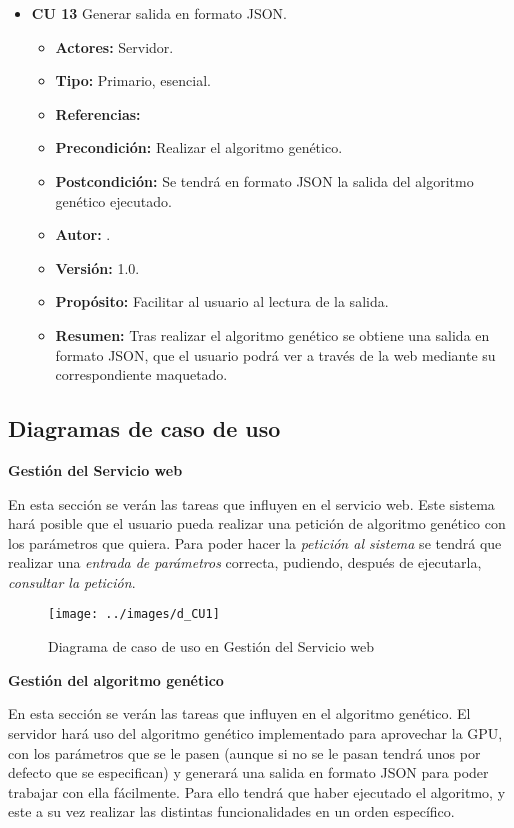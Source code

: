 \begin{itemize}
	\item \textbf{CU 13} Generar salida en formato JSON.
	\begin{itemize}
		\item \textbf{Actores:} Servidor.
		\item \textbf{Tipo:} Primario, esencial.
		\item \textbf{Referencias:} 
		\item \textbf{Precondición:} Realizar el algoritmo genético.
		\item \textbf{Postcondición:} Se tendrá en formato JSON la salida del algoritmo genético ejecutado.
		\item\textbf{ Autor:} {\autor}.
		\item \textbf{Versión:} 1.0.
		\item \textbf{Propósito:} Facilitar al usuario al lectura de la salida.
		\item \textbf{Resumen:} Tras realizar el algoritmo genético se obtiene una salida en formato JSON, que el usuario podrá ver a través de la web mediante su correspondiente maquetado.
	\end{itemize}				
	
	
\end{itemize} %

\newpage %
\subsection{Diagramas de caso de uso}

\bigskip
\textbf{Gestión del Servicio web}

\bigskip
En esta sección se verán las tareas que influyen en el servicio web. Este sistema hará posible que el usuario pueda realizar una petición de algoritmo genético con los parámetros que quiera. Para poder hacer la \textit{petición al sistema} se tendrá que realizar una \textit{entrada de parámetros} correcta, pudiendo, después de ejecutarla, \textit{consultar la petición}.


\bigskip
\begin{figure}[h]
	\centering
	\texttt{[image: ../images/d\_CU1]}
	\caption[Diagrama de caso de uso en Gestión del Servicio web]{Diagrama de caso de uso en Gestión del Servicio web}
	\label{fig:d_CU1}
\end{figure}



\newpage %
\textbf{Gestión del algoritmo genético}

\bigskip
En esta sección se verán las tareas que influyen en el algoritmo genético. El servidor hará uso del algoritmo genético implementado para aprovechar la GPU, con los parámetros que se le pasen (aunque si no se le pasan tendrá unos por defecto que se especifican) y generará una salida en formato JSON para poder trabajar con ella fácilmente. Para ello tendrá que haber ejecutado el algoritmo, y este a su vez realizar las distintas funcionalidades en un orden específico.

